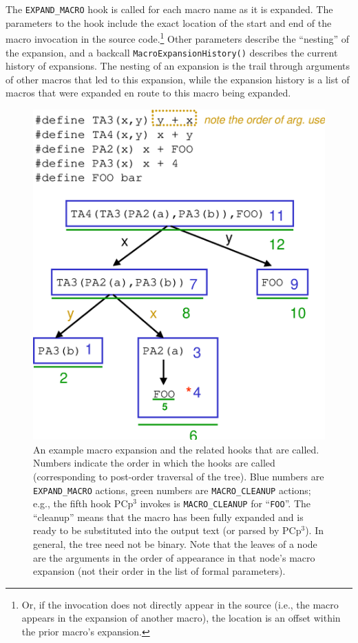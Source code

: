 \documentclass{article}
\newcommand{\pcp}{\mbox{\textsf{PCp}$^3$}}
\newcommand{\ie}{i.e.,}
\newcommand{\eg}{e.g.,}
\begin{document}
\noindent The \texttt{EXPAND\_MACRO} hook is called for each macro name as it is
expanded.  The parameters to the hook include the exact location of the
start and end of the macro invocation in the source code.\footnote{Or,
  if the invocation does not directly appear in the source (\ie{} the
  macro appears in the expansion of another macro), the location is an
  offset within the prior macro's expansion.}  Other parameters
describe the ``nesting'' of the expansion, and a backcall
\texttt{Macro\-Expansion\-History()} describes the current history of
expansions.  The nesting of an expansion is the trail through arguments
of other macros that led to this expansion, while the expansion history
is a list of macros that were expanded en route to this macro being
expanded.

\begin{figure}[p]
  \begin{center}
    \leavevmode
    \includegraphics[width=0.45\linewidth]{tree-expn.eps}
    \caption{An example macro expansion and the related
      hooks that are called. Numbers indicate the order in which the
      hooks are called (corresponding to post-order traversal of the
      tree). Blue numbers are \texttt{EXPAND\_MACRO} actions, green
      numbers are \texttt{MACRO\_CLEANUP} actions; \eg{} the fifth hook
      \pcp{} invokes is \texttt{MACRO\_CLEANUP} for ``\texttt{FOO}''.
      The ``cleanup'' means that the macro has been fully expanded and
      is ready to be substituted into the output text (or parsed by
      \pcp{}). In general, the tree need not be
      binary. Note that the leaves of a node are the arguments in the
      order of appearance in that node's macro expansion (not their
      order in the list of formal parameters).}
    \label{fig:tree-expn}
  \end{center}
\end{figure}
\end{document}
